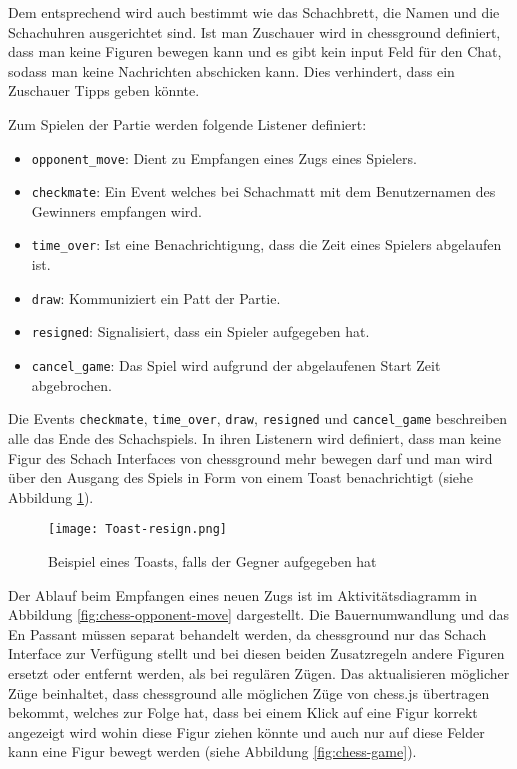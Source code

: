Dem entsprechend wird auch bestimmt wie das Schachbrett, die Namen und die Schachuhren ausgerichtet sind. Ist man Zuschauer wird in chessground definiert, dass man keine Figuren bewegen kann und es gibt kein input Feld für den Chat, sodass man keine Nachrichten abschicken kann. Dies verhindert, dass ein Zuschauer Tipps geben könnte.

Zum Spielen der Partie werden folgende Listener definiert:
\begin{itemize}
\item \verb|opponent_move|: Dient zu Empfangen eines Zugs eines Spielers.
\item \verb|checkmate|: Ein Event welches bei Schachmatt mit dem Benutzernamen des Gewinners empfangen wird.
\item \verb|time_over|: Ist eine Benachrichtigung, dass die Zeit eines Spielers abgelaufen ist.
\item \verb|draw|: Kommuniziert ein Patt der Partie.
\item \verb|resigned|: Signalisiert, dass ein Spieler aufgegeben hat.
\item \verb|cancel_game|: Das Spiel wird aufgrund der abgelaufenen Start Zeit abgebrochen.
\end{itemize}
Die Events \verb|checkmate|, \verb|time_over|, \verb|draw|, \verb|resigned| und \verb|cancel_game| beschreiben alle das Ende des Schachspiels. In ihren Listenern wird definiert, dass man keine Figur des Schach Interfaces von chessground mehr bewegen darf und man wird über den Ausgang des Spiels in Form von einem Toast benachrichtigt (siehe Abbildung \ref{fig:resign-toast}).

\begin{figure}[h]
\centering
\texttt{[image: Toast-resign.png]}
\caption{Beispiel eines Toasts, falls der Gegner aufgegeben hat}
\label{fig:resign-toast}
\end{figure}

Der Ablauf beim Empfangen eines neuen Zugs ist im Aktivitätsdiagramm in Abbildung \ref{fig:chess-opponent-move} dargestellt. Die Bauernumwandlung und das En Passant müssen separat behandelt werden, da chessground nur das Schach Interface zur Verfügung stellt und bei diesen beiden Zusatzregeln andere Figuren ersetzt oder entfernt werden, als bei regulären Zügen. Das aktualisieren möglicher Züge beinhaltet, dass chessground alle möglichen Züge von chess.js übertragen bekommt, welches zur Folge hat, dass bei einem Klick auf eine Figur korrekt angezeigt wird wohin diese Figur ziehen könnte und auch nur auf diese Felder kann eine Figur bewegt werden (siehe Abbildung \ref{fig:chess-game}).

